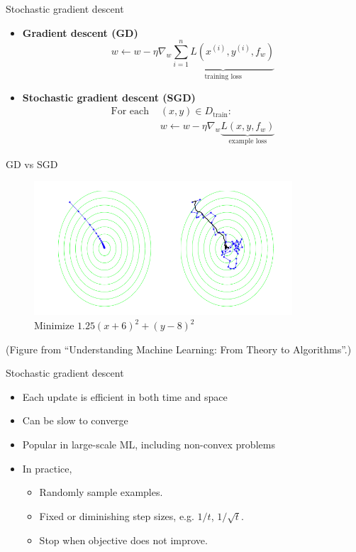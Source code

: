 \documentclass[usenames,dvipsnames,notes]{beamer}
\begin{document}
\begin{frame}
    {Stochastic gradient descent}
    \begin{itemize}
        \item \textbf{Gradient descent (GD)}
            $$
            w \leftarrow w - \eta\nabla_w \underbrace{\sum_{i=1}^n L(x^{(i)}, y^{(i)}, f_w)}_{\text{training loss}}
            $$
        \item \textbf{Stochastic gradient descent (SGD)}\\
            \begin{align*}
                \text{For each } &(x, y) \in D_{\text{train}}:\\
                &w \leftarrow w - \eta\nabla_w \underbrace{L(x, y, f_w)}_{\text{example loss}}
            \end{align*}
    \end{itemize}
\end{frame}

\begin{frame}
    {GD vs SGD}
    \begin{figure}
        \caption{Minimize $1.25(x + 6)^2 + (y - 8)^2$}
        \includegraphics[height=5cm]{figures/gd-vs-sgd}
    \end{figure}
    (\small{Figure from ``Understanding Machine Learning: From Theory to Algorithms''.})
\end{frame}

\begin{frame}
    {Stochastic gradient descent}
    \begin{itemize}
        \itemsep1em
        \item Each update is efficient in both time and space
        \item Can be slow to converge 
        \item Popular in large-scale ML, including non-convex problems
        \item In practice, 
            \begin{itemize}
                \item[] Randomly sample examples.
                \item[] Fixed or diminishing step sizes, e.g. $1/t$, $1/\sqrt{t}$.
                \item[] Stop when objective does not improve.
            \end{itemize}
    \end{itemize}
\end{frame}
\end{document}
